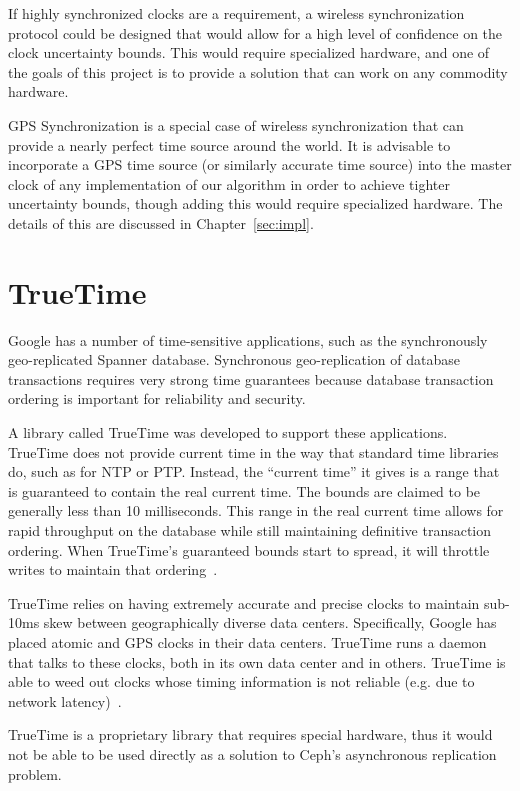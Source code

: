 If highly synchronized clocks are a requirement, a wireless
synchronization protocol could be designed that would allow for a high
level of confidence on the clock uncertainty bounds.  This would
require specialized hardware, and one of the goals of this project is
to provide a solution that can work on any commodity hardware.

GPS Synchronization is a special case of wireless synchronization that
can provide a nearly perfect time source around the world. It is
advisable to incorporate a GPS time source (or similarly accurate time
source) into the master clock of any implementation of our algorithm
in order to achieve tighter uncertainty bounds, though adding this
would require specialized hardware.  The details of this are discussed
in Chapter~\ref{sec:impl}.

\section{TrueTime}

Google has a number of time-sensitive applications, such as the
synchronously geo-replicated Spanner database. Synchronous
geo-replication of database transactions requires very strong time
guarantees because database transaction ordering is important for
reliability and security.

A library called TrueTime was developed to support these applications.
TrueTime does not provide current time in the way that standard time
libraries do, such as for NTP or PTP. Instead, the ``current time'' it
gives is a range that is guaranteed to contain the real current
time. The bounds are claimed to be generally less than 10
milliseconds. This range in the real current time allows for rapid
throughput on the database while still maintaining definitive
transaction ordering. When TrueTime's guaranteed bounds start to
spread, it will throttle writes to maintain that
ordering~\citep{Corbett2012}.

TrueTime relies on having extremely accurate and precise clocks to
maintain sub-10ms skew between geographically diverse data
centers. Specifically, Google has placed atomic and GPS clocks in
their data centers. TrueTime runs a daemon that talks to these clocks,
both in its own data center and in others. TrueTime is able to weed
out clocks whose timing information is not reliable (e.g. due to
network latency)~\citep{Corbett2012}.

TrueTime is a proprietary library that requires special hardware, thus
it would not be able to be used directly as a solution to Ceph's
asynchronous replication problem.

